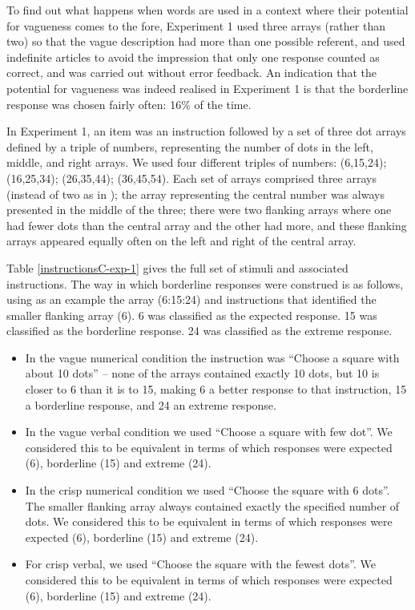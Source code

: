 
To find out what happens when words are used in a context where their potential for vagueness comes to the fore, Experiment 1 used three arrays (rather than two) so that the vague description had more than one possible referent, and used indefinite articles to avoid the impression that only one response counted as correct, and was carried out without error feedback. An indication that the potential for vagueness was indeed realised in Experiment 1 is that the borderline response was chosen fairly often: 16\% of the time.

In Experiment 1, an item was an instruction followed by a set of three dot arrays defined by a triple of numbers, representing the number of dots in the left, middle, and right arrays. We used four different triples of numbers: (6,15,24); (16,25,34); (26,35,44); (36,45,54). Each set of arrays comprised three arrays (instead of two as in \citet{green2013utility}); the array representing the central number was always presented in the middle of the three; there were two flanking arrays where one had fewer dots than the central array and the other had more, and these flanking arrays appeared equally often on the left and right of the central array. 

Table \ref{instructionsC-exp-1} gives the full set of stimuli and associated instructions. The way in which borderline responses were construed is as follows, using as an example the array (6:15:24) and instructions that identified the smaller flanking array (6). 6 was classified as the expected response. 15 was classified as the borderline response. 24 was classified as the extreme response. 

\begin{itemize}
	\item In the vague numerical condition the instruction was ``Choose a square with about 10 dots'' -- none of the arrays contained exactly 10 dots, but 10 is closer to 6 than it is to 15, making 6 a better response to that instruction, 15 a borderline response, and 24 an extreme response.
	\item In the vague verbal condition we used ``Choose a square with few dot''. We considered this to be equivalent in terms of which responses were expected (6), borderline (15) and extreme (24).
	\item In the crisp numerical condition we used ``Choose the square with 6 dots''. The smaller flanking array always contained exactly the specified number of dots. We considered this to be equivalent in terms of which responses were expected (6), borderline (15) and extreme (24).
	\item For crisp verbal, we used ``Choose the square with the fewest dots''. We considered this to be equivalent in terms of which responses were expected (6), borderline (15) and extreme (24).
\end{itemize}

